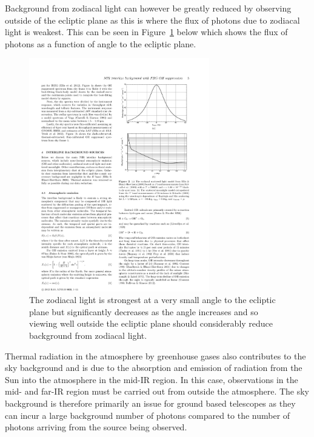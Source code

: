 			Background from zodiacal light can however be greatly reduced by observing outside of the ecliptic plane as this is where the flux of photons due to zodiacal light is weakest. This can be seen in Figure~\ref{fig:zodiacal_light_graph} below which shows the flux of photons as a function of angle to the ecliptic plane.
			\begin{figure}[!htbp]
				\centering
				\includegraphics[trim = 110mm 198mm 25mm 30mm, clip, width=0.7\textwidth]{../Images/zodiacal_Light_graph.pdf}
				\caption[Zodiacal light vs angle]{The zodiacal light is strongest at a very small angle to the ecliptic plane but significantly decreases as the angle increases and so viewing well outside the ecliptic plane should considerably reduce background from zodiacal light\cite{Zodiacal_Light_over_La_Silla}.}\label{fig:zodiacal_light_graph}
			\end{figure}

			Thermal radiation in the atmosphere by greenhouse gases also contributes to the sky background and is due to the absorption and emission of radiation from the Sun into the atmosphere in the mid-IR region. In this case, observations in the mid- and far-IR region must be carried out from outside the atmosphere\cite{Extragalactic_Astronomy_and_Cosmology}. The sky background is therefore primarily an issue for ground based telescopes as they can incur a large background number of photons compared to the number of photons arriving from the source being observed.

